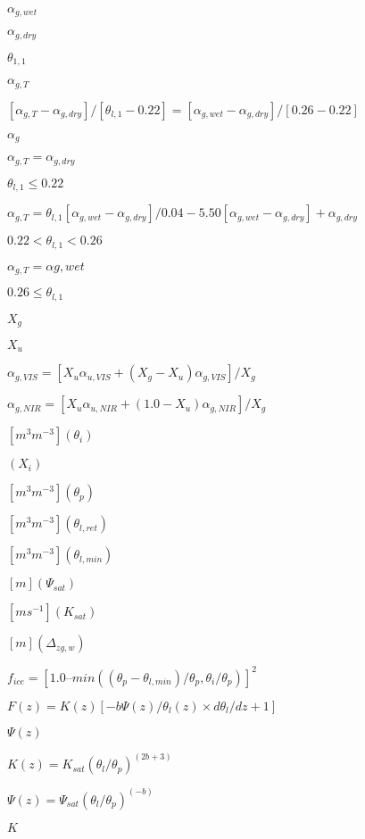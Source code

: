 \documentclass{article}
\begin{document}
$\alpha_{g,wet}$
\pagebreak

$\alpha_{g,dry}$
\pagebreak

$\theta_{1,1}$
\pagebreak

$\alpha_{g,T}$
\pagebreak

$[\alpha_{g,T} - \alpha_{g,dry} ] / [\theta_{l,1} - 0.22] = [\alpha_{g,wet} - \alpha_{g,dry} ]/[0.26 - 0.22]$
\pagebreak

$\alpha_{g}$
\pagebreak

$\alpha_{g,T} = \alpha_{g,dry}$
\pagebreak

$\theta_{l,1} \leq 0.22 $
\pagebreak

$\alpha_{g,T} = \theta_{l,1} [\alpha_{g,wet} - \alpha_{g,dry} ]/0.04 - 5.50 [\alpha_{g,wet} - \alpha_{g,dry} ] + \alpha_{g,dry} $
\pagebreak

$0.22 < \theta_{l,1} < 0.26 $
\pagebreak

$\alpha_{g,T} = \alpha{g,wet} $
\pagebreak

$ 0.26 \leq \theta_{l,1}$
\pagebreak

$X_g$
\pagebreak

$X_u$
\pagebreak

$\alpha_{g,VIS} = [X_u \alpha_{u,VIS} + (X_g-X_u ) \alpha_{g,VIS}] / X_g $
\pagebreak

$\alpha_{g,NIR} = [X_u \alpha_{u,NIR} + (1.0-X_u ) \alpha_{g,NIR}] / X_g $
\pagebreak

$[m^3 m^{-3}] (\theta_i)$
\pagebreak

$(X_i)$
\pagebreak

$[m^3 m^{-3}] (\theta_p)$
\pagebreak

$[m^3 m^{-3} ] (\theta_{l,ret})$
\pagebreak

$[m^3 m^{-3}] (\theta_{l,min})$
\pagebreak

$[m] (\Psi_{sat})$
\pagebreak

$[m s^{-1}] (K_{sat})$
\pagebreak

$[m] (\Delta_{zg,w})$
\pagebreak

$f_{ice} = [1.0 – min((\theta_p - \theta_{l,min} )/\theta_p , \theta_i / \theta_p )]^2$
\pagebreak

$F(z) = K(z) [-b \Psi(z)/\theta_l(z) \times d\theta_l / dz + 1]$
\pagebreak

$\Psi(z)$
\pagebreak

$K(z) = K_{sat} (\theta_l/\theta_p)^{(2b + 3)}$
\pagebreak

$\Psi(z) = \Psi_{sat} (\theta_l/\theta_p)^{(-b )}$
\pagebreak

$K$
\pagebreak
\end{document}
